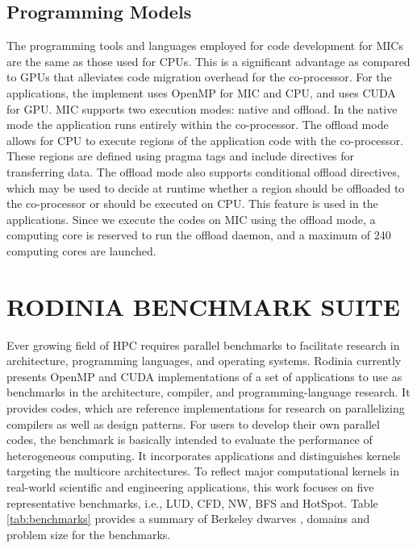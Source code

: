 \subsection{Programming Models\\}
\vspace{-4mm} 
The programming tools and languages employed for code development for MICs are the same as those used for CPUs. This is a significant advantage as compared to GPUs that alleviates code migration overhead for the co-processor. For the applications, the implement uses OpenMP for MIC and CPU, and uses CUDA for GPU. MIC supports two execution modes: native and offload. In the native mode the application runs entirely within the co-processor. The offload mode allows for CPU to execute regions of the application code with the co-processor. These regions are defined using pragma tags and include directives for transferring data. The offload mode also supports conditional offload directives, which may be used to decide at runtime whether a region should be offloaded to the co-processor or should be executed on CPU. This feature is used in the applications. Since we execute the codes on MIC using the offload mode, a computing core is reserved to run the offload daemon, and a maximum of 240 computing cores are launched.
  
  
  \section{RODINIA BENCHMARK SUITE}

  Ever growing field of HPC requires parallel benchmarks to facilitate research in architecture, programming languages, and operating systems. Rodinia currently presents OpenMP and CUDA implementations of a set of applications to use as benchmarks in the architecture, compiler, and programming-language research. It provides codes, which are reference implementations for research on parallelizing compilers as well as design patterns. For users to develop their own parallel codes, the benchmark is basically intended to evaluate the performance of heterogeneous computing. It incorporates applications and distinguishes kernels targeting the multicore architectures. To reflect major computational kernels in real-world scientific and engineering applications, this work focuses on five representative benchmarks, i.e., LUD, CFD, NW, BFS and HotSpot. Table \ref{tab:benchmarks} provides a summary of Berkeley dwarves \cite{asanovic2006landscape}, domains and problem size for the benchmarks. 


